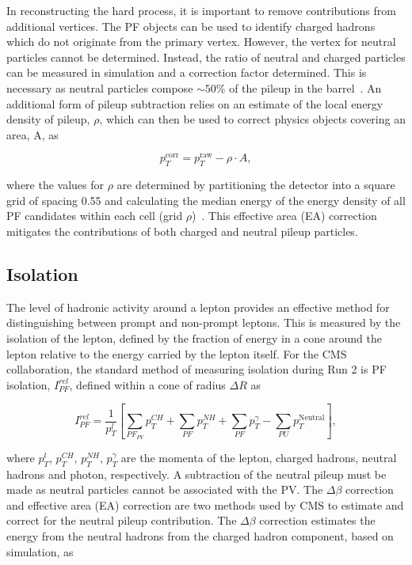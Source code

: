 In reconstructing the hard process, it is important to remove contributions from additional
vertices. The PF objects can be used to identify 
charged hadrons which do not originate from the primary vertex. However, the vertex 
for neutral particles cannot be determined. Instead, the ratio of neutral and 
charged particles can be measured in simulation and a correction factor determined.
This is necessary as neutral particles compose $\sim 50\%$ of the pileup in the barrel~\cite{neutralPU}.
An additional form of pileup subtraction relies on an estimate of the local energy density 
of pileup, $\rho$, which can then be used to correct physics objects covering an area,
A, as

\begin{equation}
p_T^{\text{corr}} = p_T^{\text{raw}} - \rho \cdot A,
\end{equation}

\noindent where the values for $\rho$ are determined by partitioning the detector into a square grid of spacing
0.55 and calculating the median energy of the energy density of all PF candidates within each cell (grid $\rho$)~\cite{fastjet,jet_area}.
This effective area (EA) correction mitigates the contributions of both charged and neutral 
pileup particles.

\subsection{Isolation}

The level of hadronic activity around a lepton provides an effective method for 
distinguishing between prompt and non-prompt leptons.
This is measured by the isolation of the lepton, defined by the fraction of energy
in a cone around the lepton relative to the energy carried by the lepton itself. For the
CMS collaboration, the standard method of measuring isolation during Run 2 
is PF isolation, $I_{PF}^{rel}$, defined within a cone of radius $\Delta R$ as 

\begin{equation}
I_{PF}^{rel} = \frac{1}{p_T^{l}}\left[ \sum_{PF_{PV}}p_T^{CH} +  \sum_{PF}p_T^{NH} +  \sum_{PF}p_T^{\gamma} -  \sum_{PU}p_T^{\text{Neutral}}\right],
\end{equation}

\noindent where $p_T^{l}$, $p_T^{CH}$, $p_T^{NH}$, $p_T^{\gamma}$ are the momenta of the lepton, charged hadrons, neutral hadrons and photon, respectively.
A subtraction of the neutral pileup must be made as neutral particles cannot be associated with the PV. The $\Delta \beta$ correction
and effective area (EA) correction are two methods used by CMS to estimate and correct for the neutral pileup contribution. The $\Delta \beta$
correction estimates the energy from the neutral hadrons from the charged hadron component, based on simulation, as

